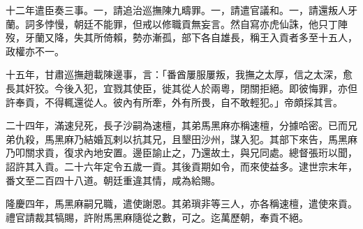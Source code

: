 \begin{pinyinscope}
十二年遣臣奏三事。一，請追治巡撫陳九疇罪。一，請遣官議和。一，請還叛人牙蘭。詞多悖慢，朝廷不能罪，但戒以修職貢無妄言。然自寫亦虎仙誅，他只丁陣歿，牙蘭又降，失其所倚賴，勢亦漸孤，部下各自雄長，稱王入貢者多至十五人，政權亦不一。

十五年，甘肅巡撫趙載陳邊事，言：「番酋屢服屢叛，我撫之太厚，信之太深，愈長其奸狡。今後入犯，宜戮其使臣，徙其從人於兩粵，閉關拒絕。即彼悔罪，亦但許奉貢，不得輒還從人。彼內有所牽，外有所畏，自不敢輕犯。」帝頗採其言。

二十四年，滿速兒死，長子沙嗣為速檀，其弟馬黑麻亦稱速檀，分據哈密。已而兄弟仇殺，馬黑麻乃結婚瓦剌以抗其兄，且墾田沙州，謀入犯。其部下來告，馬黑麻乃叩關求貢，復求內地安置。邊臣諭止之，乃還故土，與兄同處。總督張珩以聞，詔許其入貢。二十六年定令五歲一貢。其後貢期如令，而來使益多。逮世宗末年，番文至二百四十八道。朝廷重違其情，咸為給賜。

隆慶四年，馬黑麻嗣兄職，遣使謝恩。其弟瑣非等三人，亦各稱速檀，遣使來貢。禮官請裁其犒賜，許附馬黑麻隨從之數，可之。迄萬歷朝，奉貢不絕。


\end{pinyinscope}